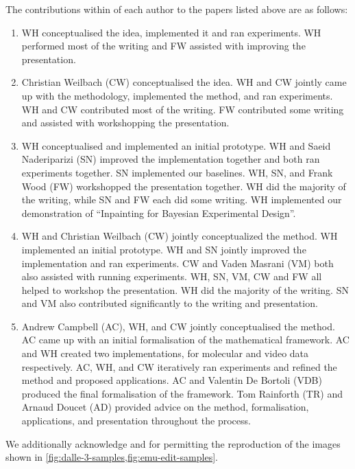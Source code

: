 The contributions within of each author to the papers listed above are as follows:
\begin{enumerate}
    \item WH conceptualised the idea, implemented it and ran experiments. WH performed most of the writing and FW assisted with improving the presentation.
    \item Christian Weilbach (CW) conceptualised the idea. WH and CW jointly came up with the methodology, implemented the method, and ran experiments. WH and CW contributed most of the writing. FW contributed some writing and assisted with workshopping the presentation.  
    \item WH conceptualised and implemented an initial prototype. WH and Saeid Naderiparizi (SN) improved the implementation together and both ran experiments together.  SN implemented our baselines. WH, SN, and Frank Wood (FW) workshopped the presentation together. WH did the majority of the writing, while SN and FW each did some writing. WH implemented our demonstration of ``Inpainting for Bayesian Experimental Design''.
    \item WH and Christian Weilbach (CW) jointly conceptualized the method. WH implemented an initial prototype. WH and SN jointly improved the implementation and ran experiments. CW and Vaden Masrani (VM) both also assisted with running experiments. WH, SN, VM, CW and FW all helped to workshop the presentation. WH did the majority of the writing. SN and VM also contributed significantly to the writing and presentation.
    \item Andrew Campbell (AC), WH, and CW jointly conceptualised the method. AC came up with an initial formalisation of the mathematical framework. AC and WH created two implementations, for molecular and video data respectively. AC, WH, and CW iteratively ran experiments and refined the method and proposed applications. AC and Valentin De Bortoli (VDB) produced the final formalisation of the framework. Tom Rainforth (TR) and Arnaud Doucet (AD) provided advice on the method, formalisation, applications, and presentation throughout the process.
\end{enumerate}

We additionally acknowledge \citeauthor{sheynin2023emu} and \citeauthor{betker2023improving} for permitting the reproduction of the images shown in \cref{fig:dalle-3-samples,fig:emu-edit-samples}.
